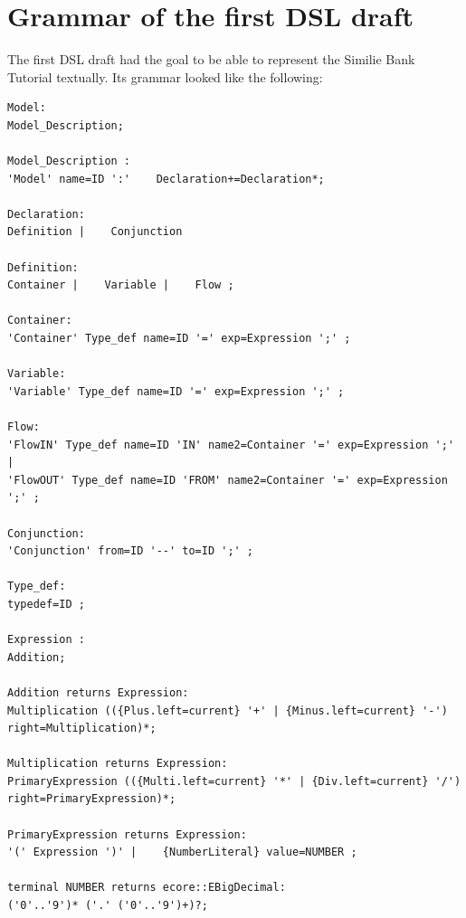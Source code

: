 \section{Grammar of the first DSL draft}
\par
The first DSL draft had the goal to be able to represent the Similie Bank Tutorial \autocite{dsl:similie_tutorial_bank} textually. Its grammar looked like the following:
\begin{lstlisting}
Model:
Model_Description;

Model_Description :
'Model' name=ID ':'    Declaration+=Declaration*;

Declaration:
Definition |    Conjunction

Definition:
Container |    Variable |    Flow ;

Container:
'Container' Type_def name=ID '=' exp=Expression ';' ;

Variable:
'Variable' Type_def name=ID '=' exp=Expression ';' ;

Flow:
'FlowIN' Type_def name=ID 'IN' name2=Container '=' exp=Expression ';' |
'FlowOUT' Type_def name=ID 'FROM' name2=Container '=' exp=Expression ';' ;

Conjunction:
'Conjunction' from=ID '--' to=ID ';' ;

Type_def:
typedef=ID ;

Expression :
Addition;

Addition returns Expression:
Multiplication (({Plus.left=current} '+' | {Minus.left=current} '-') right=Multiplication)*;

Multiplication returns Expression:
PrimaryExpression (({Multi.left=current} '*' | {Div.left=current} '/') right=PrimaryExpression)*;

PrimaryExpression returns Expression:
'(' Expression ')' |    {NumberLiteral} value=NUMBER ;

terminal NUMBER returns ecore::EBigDecimal:
('0'..'9')* ('.' ('0'..'9')+)?;
\end{lstlisting}

